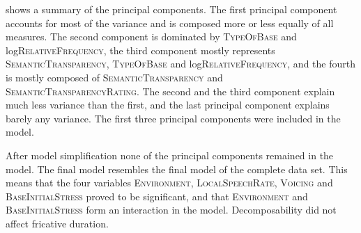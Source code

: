  shows a summary of the principal components. The first principal component accounts for most of the variance and is composed more or less equally of all measures. The second component is dominated by \textsc{TypeOfBase} and log\textsc{RelativeFrequency}, the third component mostly represents \textsc{SemanticTransparency}, \textsc{TypeOfBase} and log\textsc{RelativeFrequency}, and the fourth is mostly composed of \textsc{SemanticTransparency} and \textsc{SemanticTransparencyRating}. The second and the third component explain much less variance than the first, and the last principal component explains barely any variance. The first three principal components were included in the model.



After model simplification none of the principal components remained in the model. The final model resembles the final model of the complete data set. This means that the four variables \textsc{Environment}, \textsc{LocalSpeechRate}, \textsc{Voicing} and \textsc{BaseInitialStress} proved to be significant, and that \textsc{Environment} and \textsc{BaseInitialStress} form an interaction in the model. Decomposability did not affect fricative duration. 


\begin{table}
	\caption{ Summary of principal components}
	\label{tbl: summary PC discorpus}
	
	
\end{table}

